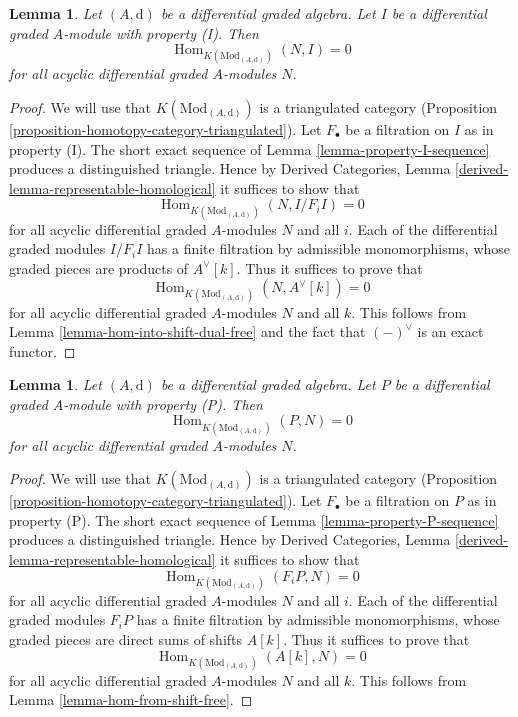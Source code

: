 \documentclass{stacks-project}
\theoremstyle{plain}
\newtheorem{lemma}[subsection]{Lemma}
\theoremstyle{definition}
\theoremstyle{remark}
\numberwithin{equation}{subsection}
\def\Hom{\mathop{\mathrm{Hom}}\nolimits}
\begin{document}
\begin{lemma}
\label{lemma-property-I-K-injective}
Let $(A, \text{d})$ be a differential graded algebra.
Let $I$ be a differential graded $A$-module with property (I).
Then
$$
\Hom_{K(\text{Mod}_{(A, \text{d})})}(N, I) = 0
$$
for all acyclic differential graded $A$-modules $N$.
\end{lemma}

\begin{proof}
We will use that $K(\text{Mod}_{(A, \text{d})})$ is a triangulated
category (Proposition \ref{proposition-homotopy-category-triangulated}).
Let $F_\bullet$ be a filtration on $I$ as in property (I).
The short exact sequence of Lemma \ref{lemma-property-I-sequence}
produces a distinguished triangle. Hence by
Derived Categories, Lemma \ref{derived-lemma-representable-homological}
it suffices to show that
$$
\Hom_{K(\text{Mod}_{(A, \text{d})})}(N, I/F_iI) = 0
$$
for all acyclic differential graded $A$-modules $N$ and all $i$.
Each of the differential graded modules $I/F_iI$ has a finite filtration
by admissible monomorphisms, whose graded pieces are
products of $A^\vee[k]$. Thus it suffices to prove that
$$
\Hom_{K(\text{Mod}_{(A, \text{d})})}(N, A^\vee[k]) = 0
$$
for all acyclic differential graded $A$-modules $N$ and all $k$.
This follows from Lemma \ref{lemma-hom-into-shift-dual-free}
and the fact that $(-)^\vee$ is an exact functor.
\end{proof}

\begin{lemma}
\label{lemma-property-P-K-projective}
Let $(A, \text{d})$ be a differential graded algebra.
Let $P$ be a differential graded $A$-module with property (P).
Then
$$
\Hom_{K(\text{Mod}_{(A, \text{d})})}(P, N) = 0
$$
for all acyclic differential graded $A$-modules $N$.
\end{lemma}

\begin{proof}
We will use that $K(\text{Mod}_{(A, \text{d})})$ is a triangulated
category (Proposition \ref{proposition-homotopy-category-triangulated}).
Let $F_\bullet$ be a filtration on $P$ as in property (P).
The short exact sequence of Lemma \ref{lemma-property-P-sequence}
produces a distinguished triangle. Hence by
Derived Categories, Lemma \ref{derived-lemma-representable-homological}
it suffices to show that
$$
\Hom_{K(\text{Mod}_{(A, \text{d})})}(F_iP, N) = 0
$$
for all acyclic differential graded $A$-modules $N$ and all $i$.
Each of the differential graded modules $F_iP$ has a finite filtration
by admissible monomorphisms, whose graded pieces are direct sums
of shifts $A[k]$. Thus it suffices to prove that
$$
\Hom_{K(\text{Mod}_{(A, \text{d})})}(A[k], N) = 0
$$
for all acyclic differential graded $A$-modules $N$ and all $k$.
This follows from Lemma \ref{lemma-hom-from-shift-free}.
\end{proof}
\end{document}

